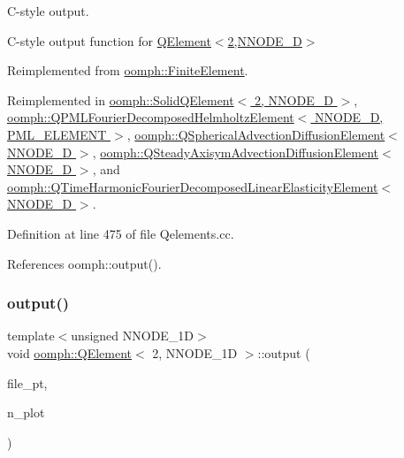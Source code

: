 C-\/style output. 

C-\/style output function for \hyperlink{classoomph_1_1QElement_3_012_00_01NNODE__1D_01_4}{Q\+Element$<$2,\+N\+N\+O\+D\+E\+\_\+D$>$} 

Reimplemented from \hyperlink{classoomph_1_1FiniteElement_a72cddd09f8ddbee1a20a1ff404c6943e}{oomph\+::\+Finite\+Element}.



Reimplemented in \hyperlink{classoomph_1_1SolidQElement_3_012_00_01NNODE__1D_01_4_a14c6010937dc14338a3b8eb4f5ab8bb6}{oomph\+::\+Solid\+Q\+Element$<$ 2, N\+N\+O\+D\+E\+\_\+D $>$}, \hyperlink{classoomph_1_1QPMLFourierDecomposedHelmholtzElement_ade1081cf429f5dd7c90e83ef924f9bea}{oomph\+::\+Q\+P\+M\+L\+Fourier\+Decomposed\+Helmholtz\+Element$<$ N\+N\+O\+D\+E\+\_\+D, P\+M\+L\+\_\+\+E\+L\+E\+M\+E\+N\+T $>$}, \hyperlink{classoomph_1_1QSphericalAdvectionDiffusionElement_a160d448e9026e125714d38a4550676a4}{oomph\+::\+Q\+Spherical\+Advection\+Diffusion\+Element$<$ N\+N\+O\+D\+E\+\_\+D $>$}, \hyperlink{classoomph_1_1QSteadyAxisymAdvectionDiffusionElement_a9af8f58f84ee30a6fdb2357afd8df51c}{oomph\+::\+Q\+Steady\+Axisym\+Advection\+Diffusion\+Element$<$ N\+N\+O\+D\+E\+\_\+D $>$}, and \hyperlink{classoomph_1_1QTimeHarmonicFourierDecomposedLinearElasticityElement_afc1d5ed96b566665d0a90c79ee347028}{oomph\+::\+Q\+Time\+Harmonic\+Fourier\+Decomposed\+Linear\+Elasticity\+Element$<$ N\+N\+O\+D\+E\+\_\+D $>$}.



Definition at line 475 of file Qelements.\+cc.



References oomph\+::output().

\mbox{\label{classoomph_1_1QElement_3_012_00_01NNODE__1D_01_4_aeaa407209398e3c0daf6968520d774ec}} 
\subsubsection{\texorpdfstring{output()}{output()}\hspace{0.1cm}{\footnotesize\ttfamily [4/4]}}
{\footnotesize\ttfamily template$<$unsigned N\+N\+O\+D\+E\+\_\+1D$>$ \\
void \hyperlink{classoomph_1_1QElement}{oomph\+::\+Q\+Element}$<$ 2, N\+N\+O\+D\+E\+\_\+1D $>$\+::output (\begin{DoxyParamCaption}\item[{F\+I\+LE $\ast$}]{file\+\_\+pt,  }\item[{const unsigned \&}]{n\+\_\+plot }\end{DoxyParamCaption})\hspace{0.3cm}{\ttfamily [virtual]}}



